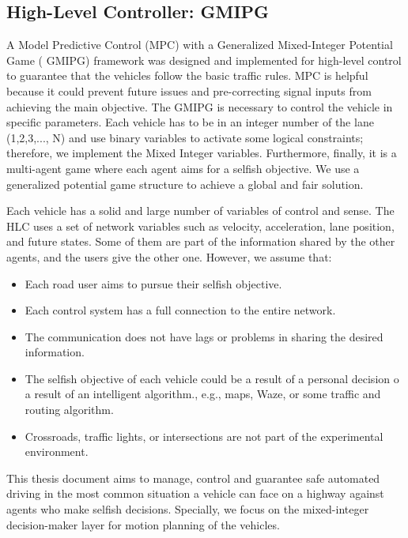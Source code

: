 
\subsection{High-Level Controller: GMIPG}
A Model Predictive Control (MPC) with a Generalized Mixed-Integer Potential Game ( GMIPG) framework was designed and implemented for high-level control to guarantee that the vehicles follow the basic traffic rules. MPC is helpful because it could prevent future issues and pre-correcting signal inputs from achieving the main objective. The GMIPG is necessary to control the vehicle in specific parameters. Each vehicle has to be in an integer number of the lane (1,2,3,..., N) and use binary variables to activate some logical constraints; therefore, we implement the Mixed Integer variables. Furthermore, finally, it is a multi-agent game where each agent aims for a selfish objective. We use a generalized potential game structure to achieve a global and fair solution. 


Each vehicle has a solid and large number of variables of control and sense. The HLC uses a set of network variables such as velocity, acceleration, lane position, and future states. Some of them are part of the information shared by the other agents, and the users give the other one. However, we assume that:
\begin{itemize}
    \item Each road user aims to pursue their selfish objective.
    \item Each control system has a full connection to the entire network.
    \item The communication does not have lags or problems in sharing the desired information.
    \item The selfish objective of each vehicle could be a result of a personal decision o a result of an intelligent algorithm., e.g., maps, Waze, or some traffic and routing algorithm.
    \item Crossroads, traffic lights, or intersections are not part of the experimental environment.
\end{itemize}

This thesis document aims to manage, control and guarantee safe automated driving in the most common situation a vehicle can face on a highway against agents who make selfish decisions. Specially, we focus on the mixed-integer decision-maker layer for motion planning of the vehicles.

